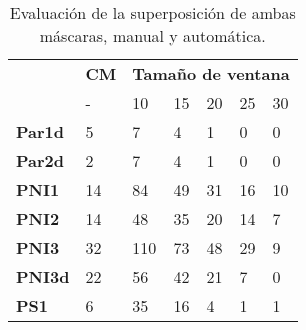 \begin{table}[]
    \begin{threeparttable}[b]
        \label{tab_homomorfico}
        \caption{Evaluación de la superposición de ambas máscaras, manual y automática.}
        \begin{tabular}{l|l|lllll|}
            \cline{2-7}
            \multirow{2}{*}{}                    & \textbf{CM\tnote{1}} & \multicolumn{5}{l|}{\textbf{Tamaño de ventana}}                                                                             \\ \cline{3-7} 
                                                 & -           & \multicolumn{1}{l|}{10}     & \multicolumn{1}{l|}{15}     & \multicolumn{1}{l|}{20}    & \multicolumn{1}{l|}{25}    & 30    \\ \hline
            \multicolumn{1}{|l|}{\textbf{Par1d}} & 5           & \multicolumn{1}{l|}{7}      & \multicolumn{1}{l|}{4}      & \multicolumn{1}{l|}{1}     & \multicolumn{1}{l|}{0}     & 0     \\ \hline
            \multicolumn{1}{|l|}{\textbf{Par2d}} & 2           & \multicolumn{1}{l|}{7}      & \multicolumn{1}{l|}{4}      & \multicolumn{1}{l|}{1}     & \multicolumn{1}{l|}{0}     & 0     \\ \hline
            \multicolumn{1}{|l|}{\textbf{PNI1}}  & 14          & \multicolumn{1}{l|}{84}     & \multicolumn{1}{l|}{49}     & \multicolumn{1}{l|}{31}    & \multicolumn{1}{l|}{16}    & 10    \\ \hline
            \multicolumn{1}{|l|}{\textbf{PNI2}}  & 14          & \multicolumn{1}{l|}{48}     & \multicolumn{1}{l|}{35}     & \multicolumn{1}{l|}{20}    & \multicolumn{1}{l|}{14}    & 7     \\ \hline
            \multicolumn{1}{|l|}{\textbf{PNI3}}  & 32          & \multicolumn{1}{l|}{110}    & \multicolumn{1}{l|}{73}     & \multicolumn{1}{l|}{48}    & \multicolumn{1}{l|}{29}    & 9     \\ \hline
            \multicolumn{1}{|l|}{\textbf{PNI3d}} & 22          & \multicolumn{1}{l|}{56}     & \multicolumn{1}{l|}{42}     & \multicolumn{1}{l|}{21}    & \multicolumn{1}{l|}{7}     & 0     \\ \hline
            \multicolumn{1}{|l|}{\textbf{PS1}}   & 6           & \multicolumn{1}{l|}{35}     & \multicolumn{1}{l|}{16}     & \multicolumn{1}{l|}{4}     & \multicolumn{1}{l|}{1}     & 1     \\ \hline

\end{tabular}
\end{threeparttable}
\end{table}
